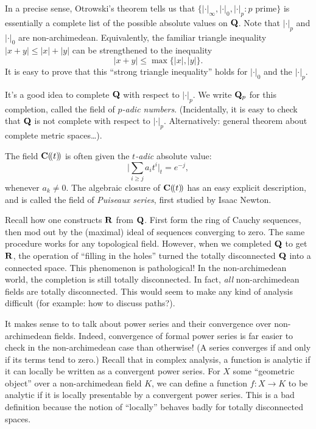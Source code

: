 In a precise sense, Otrowski's theorem tells us that 
$\{|\cdot|_\infty,|\cdot|_0,|\cdot|_p:\text{$p$ prime}\}$ is essentially a 
complete list of the possible absolute values on $\mathbf{Q}$. Note that 
$|\cdot|_p$ and $|\cdot|_0$ are non-archimedean. Equivalently, the familiar 
triangle inequality $|x+y|\leqslant |x|+|y|$ can be strengthened to the 
inequality 
\[
  |x+y| \leqslant \max\{|x|,|y|\} .
\]
It is easy to prove that this ``strong triangle inequality'' holds for 
$|\cdot|_0$ and the $|\cdot|_p$. 

It's a good idea to complete $\mathbf{Q}$ with respect to $|\cdot|_p$. We write 
$\mathbf{Q}_p$ for this completion, called the field of \emph{$p$-adic numbers}. 
(Incidentally, it is easy to check that $\mathbf{Q}$ is not complete with respect 
to $|\cdot|_p$. Alternatively: general theorem about complete metric spaces\ldots). 

\begin{example_}
The field $\mathbf{C}(\!( t)\!)$ is often given the \emph{$t$-adic} absolute 
value: 
\[
  \bigg|\sum_{i\geqslant j} a_i t^i\bigg|_t = e^{-j} ,
\]
whenever $a_k\ne 0$. The algebraic closure of $\mathbf{C}(\!( t)\!)$ has an easy 
explicit description, and is called the field of \emph{Puiseaux series}, first 
studied by Isaac Newton. 
\end{example_}

Recall how one constructs $\mathbf{R}$ from $\mathbf{Q}$. First form the ring of Cauchy 
sequences, then mod out by the (maximal) ideal of sequences converging to zero. 
The same procedure works for any topological field. However, when we completed 
$\mathbf{Q}$ to get $\mathbf{R}$, the operation of ``filling in the holes'' turned the 
totally disconnected $\mathbf{Q}$ into a connected space. This phenomenon is 
pathological! In the non-archimedean world, the completion is still totally 
disconnected. In fact, \emph{all} non-archimedean fields are totally 
disconnected. This would seem to make any kind of analysis difficult (for 
example: how to discuss paths?). 

It makes sense to to talk about power series and their convergence over 
non-archimedean fields. Indeed, convergence of formal power series is far 
easier to check in the non-archimedean case than otherwise! (A series converges 
if and only if its terms tend to zero.) Recall that in complex analysis, 
a function is analytic if it can locally be written as a convergent power 
series. For $X$ some ``geometric object'' over a non-archimedean field $K$, we 
can define a function $f\colon X\to K$ to be analytic if it is 
locally presentable by a convergent power series. This is a bad definition 
because the notion of ``locally'' behaves badly for totally disconnected 
spaces. 





